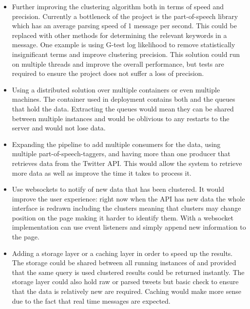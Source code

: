 \begin{itemize}
	\item Further improving the clustering algorithm both in terms of speed and precision. Currently a bottleneck of the project is the part-of-speech library which has an average parsing speed of 1 message per second. This could be replaced with other methods for determining the relevant keywords in a message. One example is using G-test log likelihood to remove statistically insignificant terms and improve clustering precision. This solution could run on multiple threads and improve the overall performance, but tests are required to ensure the project does not suffer a loss of precision.
	\item Using a distributed solution over multiple containers or even multiple machines. The container used in deployment contains both {\project}  and the queues that hold the data. Extracting the queues would mean they can be shared between multiple instances and would be oblivious to any restarts to the server and would not lose data.
	\item Expanding the pipeline to add multiple consumers for the data, using multiple part-of-speech-taggers, and having more than one producer that retrieves data from the Twitter API. This would allow the system to retrieve more data as well as improve the time it takes to process it.
	\item Use websockets to notify {\frontend}  of new data that has been clustered. It would improve the user experience: right now when the API has new data the whole interface is redrawn including the clusters meaning that clusters may change position on the page making it harder to identify them. With a websocket implementation {\frontend}  can use event listeners and simply append new information to the page.
	\item Adding a storage layer or a caching layer in order to speed up the results. The storage could be shared between all running instances of {\project}  and provided that the same query is used clustered results could be returned instantly. The storage layer could also hold raw or parsed tweets but basic check to ensure that the data is relatively new are required. Caching would make more sense due to the fact that real time messages are expected.
\end{itemize}